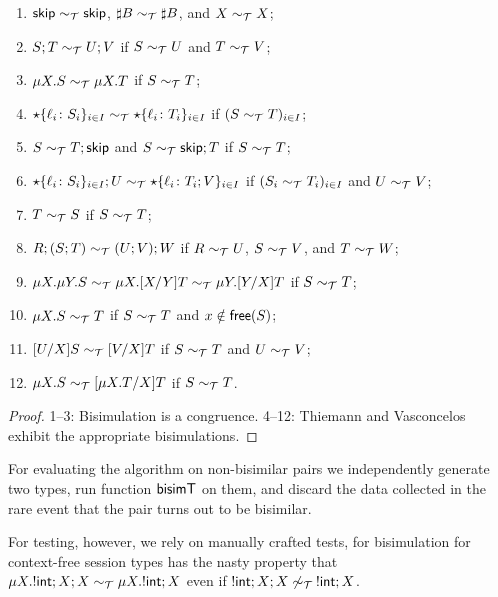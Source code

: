 \begin{theorem}
\label{thm:properties_quickcheck}
  \begin{enumerate}
  \item $\mathsf{skip} \sim_\mathcal T \mathsf{skip}$,  $\sharp B \sim_\mathcal T \sharp B$, and
    $X \sim_\mathcal T X$;
  \item $S;T \sim_\mathcal T U;V$ if $S \sim_\mathcal T U$ and $T \sim_\mathcal T V$;
  \item $\mu X.S \sim_\mathcal T \mu X.T$ if $S \sim_\mathcal T T$;
  \item $\star\{\ell_i\colon S_i\}_{i\in I}\sim_\mathcal T
    \star\{\ell_i\colon T_i\}_{i\in I}$ if $(S \sim_\mathcal T T)_{i\in
      I}$;
  \item $S\sim_\mathcal T T;\mathsf{skip}$ and $S\sim_\mathcal T \mathsf{skip};T$ if $S \sim_\mathcal T T$;
  \item $\star\{\ell_i\colon S_i\}_{i\in I};U\sim_\mathcal T
    \star\{\ell_i\colon T_i;V\}_{i\in I}$ if $(S_i \sim_\mathcal T T_i)_{i\in
      I}$ and $U \sim_\mathcal T V$;
  \item $T \sim_\mathcal T S$ if $S \sim_\mathcal T T$;
  \item $R;(S;T) \sim_\mathcal T (U;V);W$ if $R \sim_\mathcal T U$, $S \sim_\mathcal T V$, and $T\sim_\mathcal T W$;
  \item
    $\mu X.\mu Y.S \sim_\mathcal T \mu X.[{X}/{Y}]T \sim_\mathcal T \mu Y.[{Y}/{X}]T$ if $S \sim_\mathcal T T$;
  \item $\mu X.S \sim_\mathcal T T$ if $S \sim_\mathcal T T$ and $x\notin\mathsf{free}(S)$;
  \item $[{U}/{X}]S\sim_\mathcal T [{V}/{X}]T$  if $S \sim_\mathcal T T$ and $U \sim_\mathcal T V$;
  \item $\mu X.S \sim_\mathcal T [{\mu X.T}/{X}]T$ if $S \sim_\mathcal T T$.
  \end{enumerate}
\end{theorem}
%
\begin{proof}
  1--3: Bisimulation is a congruence. 4--12: Thiemann and
  Vasconcelos~\cite{thiemann2016context} exhibit the appropriate
  bisimulations.
\end{proof}

For evaluating the algorithm on
non-bisimilar pairs we independently generate two types, run
function $\mathsf{bisimT}$ on them, and discard the data collected in the rare 
event that the pair turns out to be bisimilar.
%

For testing, however, we rely on manually crafted tests, for
bisimulation for context-free session types has the nasty property
that $\mu X. !\mathsf{int};X;X \sim_\mathcal T \mu X. !\mathsf{int};X$ even if
$!\mathsf{int};X;X \not\sim_\mathcal T\: !\mathsf{int};X$.

